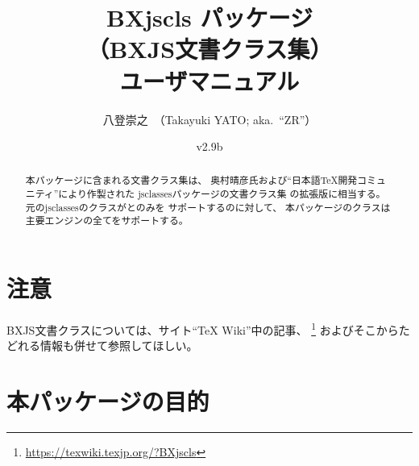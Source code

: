 \documentclass[a4paper]{ltjsarticle}
\newcommand{\PkgVersion}{2.9b}
\newcommand{\PkgDate}{2024/01/22}
\newcommand{\Pkg}[1]{\textsf{#1}}
\begin{document}
\title{\Pkg{BXjscls} パッケージ\\
  （BXJS文書クラス集）\\
  ユーザマニュアル}
\author{八登崇之\ （Takayuki YATO; aka.~``ZR''）}
\date{v\PkgVersion\quad[\PkgDate]}
\maketitle

\begin{abstract}
本パッケージに含まれる文書クラス集は、
奥村晴彦氏および“日本語{\TeX}開発コミュニティ”により作製された
\Pkg{jsclasses}パッケージの文書クラス集
の拡張版に相当する。
元の\Pkg{jsclasses}のクラスが{\pLaTeX}と{\upLaTeX}のみを
サポートするのに対して、
本パッケージのクラスは主要エンジンの全てをサポートする。
\end{abstract}

\tableofcontents

\section*{注意}

BXJS文書クラスについては、サイト“{\TeX} Wiki”中の記事、
\footnote{\url{https://texwiki.texjp.org/?BXjscls}}%
およびそこからたどれる情報も併せて参照してほしい。

\section{本パッケージの目的}
\label{sec:Ovewview}
\end{document}
